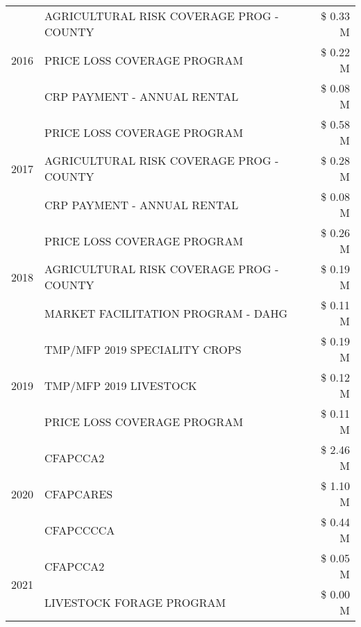 \begin{tabular}{llr}
\cline{1-3}
\multirow[t]{3}{*}{2016} & AGRICULTURAL RISK COVERAGE PROG - COUNTY & \$ 0.33 M \\
 & PRICE LOSS COVERAGE PROGRAM & \$ 0.22 M \\
 & CRP PAYMENT - ANNUAL RENTAL & \$ 0.08 M \\
\cline{1-3}
\multirow[t]{3}{*}{2017} & PRICE LOSS COVERAGE PROGRAM & \$ 0.58 M \\
 & AGRICULTURAL RISK COVERAGE PROG - COUNTY & \$ 0.28 M \\
 & CRP PAYMENT - ANNUAL RENTAL & \$ 0.08 M \\
\cline{1-3}
\multirow[t]{3}{*}{2018} & PRICE LOSS COVERAGE PROGRAM & \$ 0.26 M \\
 & AGRICULTURAL RISK COVERAGE PROG - COUNTY & \$ 0.19 M \\
 & MARKET FACILITATION PROGRAM - DAHG & \$ 0.11 M \\
\cline{1-3}
\multirow[t]{3}{*}{2019} & TMP/MFP 2019 SPECIALITY CROPS & \$ 0.19 M \\
 & TMP/MFP 2019 LIVESTOCK & \$ 0.12 M \\
 & PRICE LOSS COVERAGE PROGRAM & \$ 0.11 M \\
\cline{1-3}
\multirow[t]{3}{*}{2020} & CFAPCCA2 & \$ 2.46 M \\
 & CFAPCARES & \$ 1.10 M \\
 & CFAPCCCCA & \$ 0.44 M \\
\cline{1-3}
\multirow[t]{2}{*}{2021} & CFAPCCA2 & \$ 0.05 M \\
 & LIVESTOCK FORAGE PROGRAM & \$ 0.00 M \\
\cline{1-3}
\bottomrule
\end{tabular}
